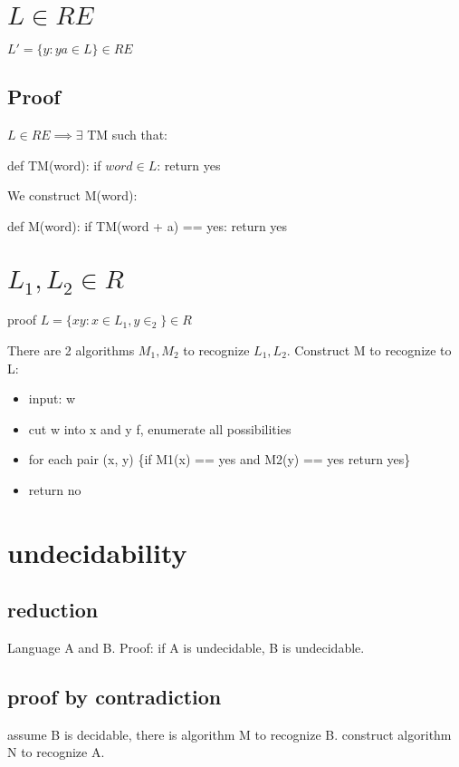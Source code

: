 \documentclass{article}
\begin{document}
\section{$ L \in RE $}
$ L' = \{y: ya \in L \} \in RE $

\subsection{Proof}
$ L \in RE \implies \exists$ TM such that:

def TM(word):
	if $ word \in L $:
		return yes

We construct M(word):

def M(word):
	if TM(word + a) == yes:
		return yes
		
\section{$ L_1, L_2 \in R$}
proof $ L = \{xy: x \in L_1, y \in _2\} \in R$
	
There are 2 algorithms $ M_1, M_2 $ to recognize $ L_1, L_2 $.
Construct M to recognize to L:
\begin{itemize}
	\item input: w
	\item cut w into x and y f, enumerate all possibilities
	\item for each pair (x, y) \{if M1(x) == yes and M2(y) == yes return yes\}
	\item return no
\end{itemize}

\section{undecidability}

\subsection{reduction}
Language A and B. Proof: if A is undecidable, B is undecidable.

\subsection{proof by contradiction}

assume B is decidable, there is algorithm M to recognize B. construct algorithm N to recognize A.
\end{document}
